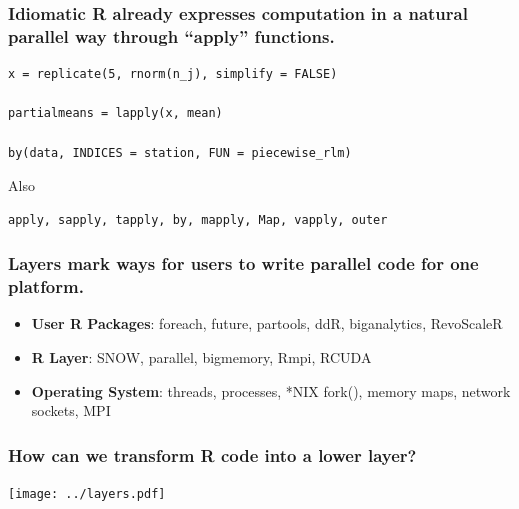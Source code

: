\documentclass{beamer}
\begin{document}
\begin{frame}[fragile]

    \frametitle{Idiomatic R already expresses computation in a natural
    parallel way through ``apply'' functions.}

\begin{verbatim}
x = replicate(5, rnorm(n_j), simplify = FALSE)

partialmeans = lapply(x, mean)

by(data, INDICES = station, FUN = piecewise_rlm)
\end{verbatim}

Also
\begin{verbatim}
apply, sapply, tapply, by, mapply, Map, vapply, outer
\end{verbatim}

\end{frame}
\begin{frame}

    \frametitle{Layers mark ways for users to write parallel code for one
    platform.}

\begin{itemize}
    \item \textbf{User R Packages}: foreach, future, partools, ddR, biganalytics, RevoScaleR
    \item \textbf{R Layer}: SNOW, parallel, bigmemory, Rmpi, RCUDA
    \item \textbf{Operating System}: threads, processes, *NIX fork(), memory maps, network sockets, MPI
\end{itemize}

\end{frame}
\begin{frame}

    \frametitle{How can we transform R code into a lower layer?}


\centerline{\texttt{[image: ../layers.pdf]}}

%
%
%
%
%

\end{frame}
\end{document}
